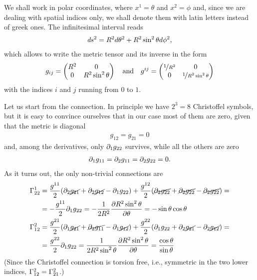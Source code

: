 We shall work in polar coordinates, where $x^1 = \theta$ and $x^2 = \phi$ and, since
we are dealing with spatial indices only, we shall denote them with latin letters
instead of greek ones. The infinitesimal interval reads
\begin{align*}
  \emph{d}s^2 = R^2 d\theta^2 + R^2 \sin^2\theta d\phi^2,
\end{align*}
which allows to write the metric tensor and its inverse in the form
\begin{align*}
  g_{ij} =
  \begin{pmatrix}
    R^2 & 0\\
    0 & R^2 \sin^2 \theta \\
  \end{pmatrix}
  \quad\text{and}\quad
  g^{ij} =
  \begin{pmatrix}
    \nicefrac{1}{R^2} & 0\\
    0 & \nicefrac{1}{R^2 \sin^2 \theta} \\
  \end{pmatrix}
\end{align*}
with the indices $i$ and $j$ running from $0$ to $1$.

Let us start from the connection. In principle we have $2^3 = 8$ Christoffel symbols,
but it is easy to convince ourselves that in our case most of them are zero, given
that the metric is diagonal
\begin{align*}
  g_{12} = g_{21} = 0
\end{align*}
and, among the derivatives, only $\partial_{1}g_{22}$ survives, while all the others
are zero
\begin{align*}
  \partial_{1}g_{11} = \partial_{2}g_{11} = \partial_{2}g_{22} = 0.
\end{align*}
As it turns out, the only non-trivial connections are
\begin{align*}
  \Gamma^{1}_{22} & =
  \frac{g^{11}}{2} (\partial_{2}\cancel{g_{21}} + \partial_{2}\cancel{g_{12}} - \partial_{1}g_{22}) +
  \frac{g^{12}}{2} (\cancel{\partial_{2}g_{22}} + \cancel{\partial_{2}g_{22}} - \cancel{\partial_{2}g_{22}}) =\\
  & = -\frac{g^{11}}{2} \partial_{1}g_{22} =
  -\frac{1}{2R^2} \pdv{R^2 \sin^2 \theta}{\theta} = -\sin\theta \cos\theta\\
  \Gamma^{2}_{12} & =
  \frac{g^{21}}{2} (\partial_{1}\cancel{g_{21}} + \cancel{\partial_{2}g_{11}} - \partial_{1}\cancel{g_{12}}) +
  \frac{g^{22}}{2} (\partial_{1}g_{22} + \partial_{2}\cancel{g_{21}} - \partial_{2}\cancel{g_{12}}) =\\
  & = \frac{g^{22}}{2} \partial_{1}g_{22} =
  \frac{1}{2R^2\sin^2\theta} \pdv{R^2 \sin^2 \theta}{\theta} = \frac{\cos\theta}{\sin\theta}
\end{align*}
(Since the Christoffel connection is torsion free, i.e., symmetric in the two lower
indices, $\Gamma^{2}_{12} = \Gamma^{2}_{21}$.)


